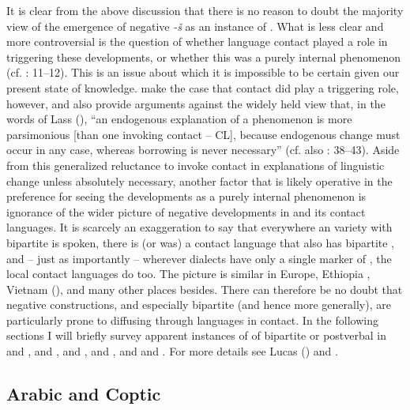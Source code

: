\documentclass[output=paper]{langsci/langscibook}
\begin{document}
It is clear from the above discussion that there is no reason to doubt the majority view of the emergence of negative \textit{{}-š} as an instance of . What is less clear and more controversial is the question of whether language contact played a role in triggering these developments, or whether this was a purely internal phenomenon (cf. \citealt{Diem2014}: 11–12). This is an issue about which it is impossible to be certain given our present state of knowledge. \citet{LucasLash2010} make the case that contact did play a triggering role, however, and also provide arguments against the widely held view that, in the words of Lass (\citeyear[209]{Lass1997}), “an endogenous explanation of a phenomenon is more parsimonious [than one invoking contact – CL], because endogenous change must occur in any case, whereas borrowing is never necessary” (cf. also \citealt{Lucas2009}: 38–43). Aside from this generalized reluctance to invoke contact in explanations of linguistic change unless absolutely necessary, another factor that is likely operative in the preference for seeing the  developments as a purely internal phenomenon is ignorance of the wider picture of negative developments in  and its contact languages. It is scarcely an exaggeration to say that everywhere an  variety with bipartite  is spoken, there is (or was) a contact language that also has bipartite , and – just as importantly – wherever  dialects have only a single marker of , the local contact languages do too. The picture is similar in Europe, Ethiopia \citep{Lucas2009}, Vietnam (\citealt{AuweraVossen2015}), and many other places besides. There can therefore be no doubt that negative constructions, and especially bipartite  (and hence  more generally), are particularly prone to diffusing through languages in contact. In the following sections I will briefly survey apparent instances of  of bipartite or postverbal  in  and ,  and ,  and ,  and , and  and . For more details see Lucas (\citeyear{Lucas2007,Lucas2009,Lucas2013}) and \citet{LucasLash2010}.



\subsection{Arabic and Coptic}
\end{document}
